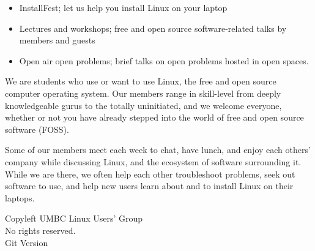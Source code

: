 \documentclass[11pt]{article}
\newcommand{\foss}{FOSS}
\begin{document}
\begin{multicols*}{2}
\begin{itemize}
    \item InstallFest; let us help you install Linux on your laptop
    \item Lectures and workshops; free and open source software-related talks by
        members and guests
    \item Open air open problems; brief talks on open problems hosted in open
        spaces.
\end{itemize}


\vfill
\phantom{x}
\columnbreak{}



We are students who use or want to use Linux, the free and open source computer
operating system. Our members range in skill-level from deeply knowledgeable
gurus to the totally uninitiated, and we welcome everyone, whether or not you
have already stepped into the world of free and open source software (\foss).

Some of our members meet each week to chat, have lunch, and enjoy each others'
company while discussing Linux, and the ecosystem of software surrounding it.
While we are there, we often help each other troubleshoot problems, seek out
software to use, and help new users learn about and to install Linux on their
laptops.

\phantom{x}
\vfill
\begin{center} \tiny
    \textcopyleft{} Copyleft \the\year{} UMBC Linux Users' Group \\
    No rights reserved. \\
    Git Version 
\end{center}
\end{multicols*}
\end{document}
